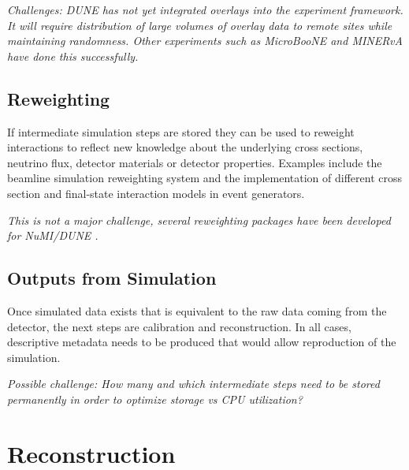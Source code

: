 \documentclass[../main-v1.tex]{subfiles}
\begin{document}
{\it Challenges: %
DUNE has not yet integrated overlays into the experiment framework. %
It will require distribution of large volumes of overlay data to remote sites while maintaining randomness. Other experiments such as MicroBooNE and MINERvA have done this successfully. }

\subsection{Reweighting}
If intermediate simulation steps  are stored they can be used to reweight interactions to reflect new knowledge about the underlying cross sections, neutrino flux, detector materials or detector properties. Examples include the  beamline simulation reweighting system and the implementation of different cross section and final-state interaction models in event generators. 

{\it This is not a major challenge, several reweighting packages have been developed for NuMI/DUNE \cite{Aliaga:2015wva, Calcutt:2021zck}.}

\subsection{Outputs from Simulation}
Once simulated data exists
that is equivalent to the raw data coming from the detector, %
the next steps are calibration and reconstruction. In all cases, descriptive metadata needs to be produced that would allow reproduction of the simulation. 

{\it Possible challenge:  How many and which intermediate steps need to be stored permanently in order to optimize storage vs CPU utilization?}



\section{Reconstruction }



\end{document}
